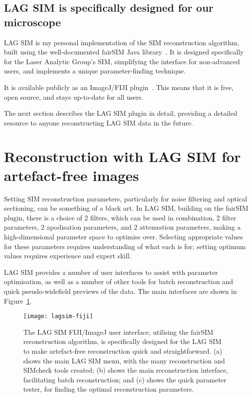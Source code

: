 
\subsection{LAG SIM is specifically designed for our microscope}
LAG SIM is my personal implementation of the SIM reconstruction algorithm, built using the well-documented fairSIM Java library~\cite{fairsimGithub}. 
It is designed specifically for the Laser Analytic Group's SIM, simplifying the interface for non-advanced users, and implements a unique parameter-finding technique.

It is available publicly as an ImageJ/FIJI plugin~\cite{lagsim}.
This means that it is free, open source, and stays up-to-date for all users. 

The next section describes the LAG SIM plugin in detail, providing a detailed resource to anyone reconstructing LAG SIM data in the future.

\section{Reconstruction with LAG SIM for artefact-free images} \label{sec:lagsimFiji}
Setting SIM reconstruction parameters, particularly for noise filtering and optical sectioning, can be something of a black art.
In LAG SIM, building on the fairSIM plugin, there is a choice of 2 filters, which can be used in combination, 2 filter parameters, 2 apodisation parameters, and 2 attenuation parameters, making a high-dimensional parameter space to optimise over. 
Selecting appropriate values for these parameters requires understanding of what each is for; setting optimum values requires experience and expert skill.

LAG SIM provides a number of user interfaces to assist with parameter optimisation, as well as a number of other tools for batch reconstruction and quick pseudo-widefield previews of the data. 
The main interfaces are shown in Figure~\ref{fig:lagsim-fiji-interface}. 

\begin{figure}[htbp!]
	\centering
		\texttt{[image: lagsim-fiji]}	
	\caption[LAG SIM: A Fiji interface makes artefact-free reconstruction quick and simple for non-expert users]{The LAG SIM FIJI/ImageJ user interface, utilising the fairSIM reconstruction algorithm, is specifically designed for the LAG SIM to make artefact-free reconstruction quick and straightforward. (a) shows the main LAG SIM menu, with the many reconstruction and SIMcheck tools created; (b) shows the main reconstruction interface, facilitating batch reconstruction; and (c) shows the quick parameter tester, for finding the optimal reconstruction parameters. } %
\label{fig:lagsim-fiji-interface}
\end{figure}

